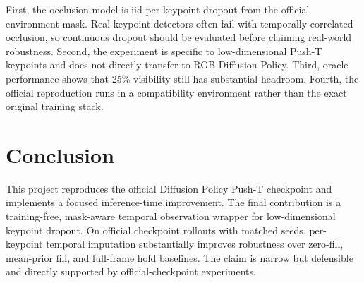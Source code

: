 \documentclass{article}
\begin{document}
First, the occlusion model is iid per-keypoint dropout from the official environment mask. Real keypoint detectors often fail with temporally correlated occlusion, so continuous dropout should be evaluated before claiming real-world robustness. Second, the experiment is specific to low-dimensional Push-T keypoints and does not directly transfer to RGB Diffusion Policy. Third, oracle performance shows that 25\% visibility still has substantial headroom. Fourth, the official reproduction runs in a compatibility environment rather than the exact original training stack.

\section{Conclusion}

This project reproduces the official Diffusion Policy Push-T checkpoint and implements a focused inference-time improvement. The final contribution is a training-free, mask-aware temporal observation wrapper for low-dimensional keypoint dropout. On official checkpoint rollouts with matched seeds, per-keypoint temporal imputation substantially improves robustness over zero-fill, mean-prior fill, and full-frame hold baselines. The claim is narrow but defensible and directly supported by official-checkpoint experiments.


\end{document}
